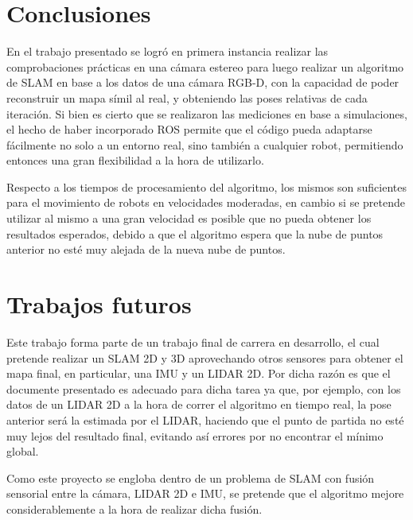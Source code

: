 \section{Conclusiones}
\label{sec:5_concl}
En el trabajo presentado se logró en primera instancia realizar las comprobaciones prácticas en una cámara estereo para luego realizar un algoritmo de SLAM en base a los datos de una cámara RGB-D, con la capacidad de poder reconstruir un mapa símil al real, y obteniendo las poses relativas de cada iteración. Si bien es cierto que se realizaron las mediciones en base a simulaciones, el hecho de haber incorporado ROS permite que el código pueda adaptarse fácilmente no solo a un entorno real, sino también a cualquier robot, permitiendo entonces una gran flexibilidad a la hora de utilizarlo. 

Respecto a los tiempos de procesamiento del algoritmo, los mismos son suficientes para el movimiento de robots en velocidades moderadas, en cambio si se pretende utilizar al mismo a una gran velocidad es posible que no pueda obtener los resultados esperados, debido a que el algoritmo espera que la nube de puntos anterior no esté muy alejada de la nueva nube de puntos. 

\section{Trabajos futuros}
Este trabajo forma parte de un trabajo final de carrera en desarrollo, el cual pretende realizar un SLAM 2D y 3D aprovechando otros sensores para obtener el mapa final, en particular, una IMU y un LIDAR 2D. Por dicha razón es que el documente presentado es adecuado para dicha tarea ya que, por ejemplo, con los datos de un LIDAR 2D a la hora de correr el algoritmo en tiempo real, la pose anterior será la estimada por el LIDAR, haciendo que el punto de partida no esté muy lejos del resultado final, evitando así errores por no encontrar el mínimo global.

Como este proyecto se engloba dentro de un problema de SLAM con fusión sensorial entre la cámara, LIDAR 2D e IMU, se pretende que el algoritmo mejore considerablemente a la hora de realizar dicha fusión.
